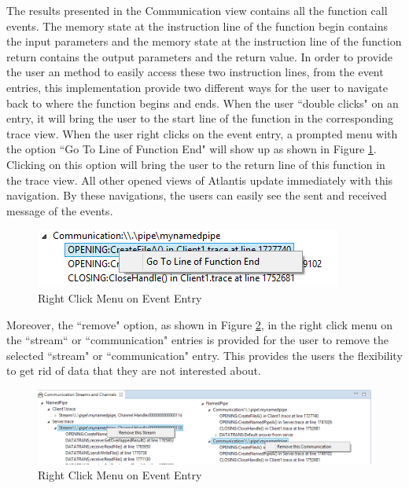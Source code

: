 The results presented in the Communication view contains all the function call events. The memory state at the instruction line of the function begin contains the input parameters and the memory state at the instruction line of the function return contains the output parameters and the return value. In order to provide the user an method to easily access these two instruction lines, from the event entries, this implementation provide two different ways for the user to navigate back to where the function begins and ends. When the user ``double clicks" on an entry, it will bring the user to the start line of the function in the corresponding trace view. When the user right clicks on the event entry, a prompted menu with the option ``Go To Line of Function End" will show up as shown in Figure \ref{gotoend}. Clicking on this option will bring the user to the return line of this function in the trace view. All other opened views of Atlantis update immediately with this navigation. By these navigations, the users can easily see the sent and received message of the events.

\begin{figure}[H]
\centerline{\includegraphics{Figures/gotoend}}
 \caption{Right Click Menu on Event Entry}
\label{gotoend}
\end{figure}

Moreover, the ``remove" option, as shown in Figure \ref{remove}, in the right click menu on the ``stream“ or ``communication" entries is provided for the user to remove the selected ``stream" or ``communication" entry. This provides the users the flexibility to get rid of data that they are not interested about.

\begin{figure}[H]
\centerline{\includegraphics[scale=0.7]{Figures/remove}}
 \caption{Right Click Menu on Event Entry}
\label{remove}
\end{figure}

